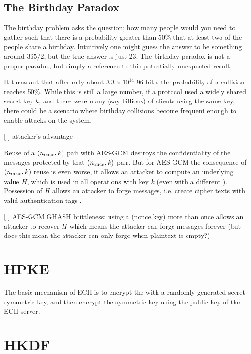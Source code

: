 \subsection{The Birthday Paradox}
The birthday problem asks the question; how many people would you need to gather such that there is a probability greater than 50\% that at least two of the people share a birthday. Intuitively one might guess the answer to be something around $365/2$, but the true answer is just 23. The birthday paradox is not a proper paradox, but simply a reference to this potentially unexpected result.

It turns out that after only about $3.3\times10^{14}$ 96 bit \nonce s the probability of a collision reaches 50\%. While this is still a large number, if a protocol used a widely shared secret key $k$, and there were many (say billions) of clients using the same key, there could be a scenario where birthday collisions become frequent enough to enable attacks on the system.

[ ] \cite{aesgcm-security} attacker's advantage

Reuse of a $(\nonce,k)$ pair with AES-GCM destroys the confidentiality of the messages protected by that $(\nonce, k)$ pair. But for AES-GCM the consequence of $(\nonce,k)$ reuse is even worse, it allows an attacker to compute an underlying value $H$, which is used in all operations with key $k$ (even with a different \nonce). Possession of $H$ allows an attacker to forge messages, i.e. create cipher texts with valid authentication tags \cite[Section 5]{aesgcm-security}.

[ ] AES-GCM GHASH brittleness: using a (nonce,key) more than once allows an attacker to recover $H$ which means the attacker can forge messages forever (but does this mean the attacker can only forge when plaintext is empty?)

\section{HPKE}
The basic mechanism of ECH is to encrypt the  with a randomly generated secret symmetric key, and then encrypt the symmetric key using the public key of the ECH server.

\section{HKDF}

